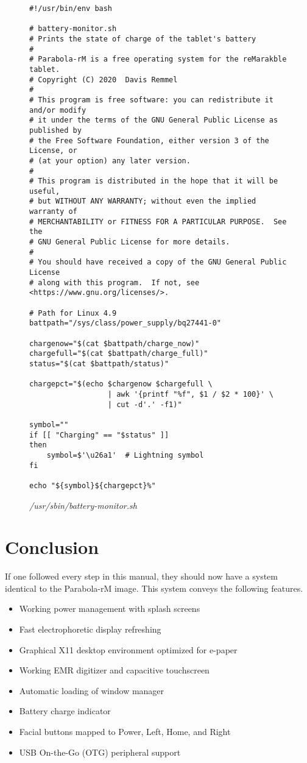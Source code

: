 \documentclass{memoir}
\begin{document}
\begin{figure}[h]
\begin{verbatim}
#!/usr/bin/env bash

# battery-monitor.sh
# Prints the state of charge of the tablet's battery
#
# Parabola-rM is a free operating system for the reMarakble tablet.
# Copyright (C) 2020  Davis Remmel
#
# This program is free software: you can redistribute it and/or modify
# it under the terms of the GNU General Public License as published by
# the Free Software Foundation, either version 3 of the License, or
# (at your option) any later version.
#
# This program is distributed in the hope that it will be useful,
# but WITHOUT ANY WARRANTY; without even the implied warranty of
# MERCHANTABILITY or FITNESS FOR A PARTICULAR PURPOSE.  See the
# GNU General Public License for more details.
#
# You should have received a copy of the GNU General Public License
# along with this program.  If not, see <https://www.gnu.org/licenses/>.

# Path for Linux 4.9
battpath="/sys/class/power_supply/bq27441-0"

chargenow="$(cat $battpath/charge_now)"
chargefull="$(cat $battpath/charge_full)"
status="$(cat $battpath/status)"

chargepct="$(echo $chargenow $chargefull \
                  | awk '{printf "%f", $1 / $2 * 100}' \
                  | cut -d'.' -f1)"

symbol=""
if [[ "Charging" == "$status" ]]
then
    symbol=$'\u26a1'  # Lightning symbol
fi

echo "${symbol}${chargepct}%"
\end{verbatim}
\caption{\textit{/usr/sbin/battery-monitor.sh}}
\label{fig:battery-monitor.sh}
\end{figure}



\chapter{Conclusion}
\label{ch:conclusion}
If one followed every step in this manual, they should now have a system identical to the Parabola-rM image. This system conveys the following features.

\begin{itemize}
  
\item{Working power management with splash screens}
\item{Fast electrophoretic display refreshing}
\item{Graphical X11 desktop environment optimized for e-paper}
\item{Working EMR digitizer and capacitive touchscreen}
\item{Automatic loading of window manager}
\item{Battery charge indicator}
\item{Facial buttons mapped to Power, Left, Home, and Right}
  \item{USB On-the-Go (OTG) peripheral support}
\end{itemize}
\end{document}
